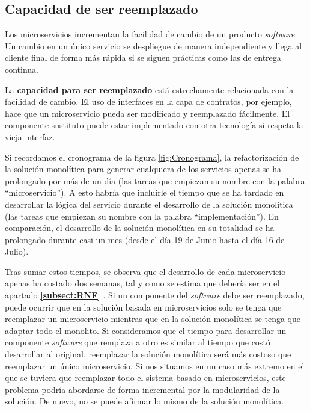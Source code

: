 \documentclass[11pt,spanish,listoffigures]{tfgetsinf}
\begin{document}
\subsection{Capacidad de ser reemplazado}

Los microservicios incrementan la facilidad de cambio de un producto \textit{software}. Un cambio en un único servicio se despliegue de manera independiente y llega al cliente final de forma más rápida si se siguen prácticas como las de entrega continua.

La \textbf{capacidad para ser reemplazado} está estrechamente relacionada con la facilidad de cambio. El uso de interfaces en la capa de contratos, por ejemplo, hace que un microservicio pueda ser modificado y reemplazado fácilmente. El componente sustituto puede estar implementado con otra tecnología si respeta la vieja interfaz.

Si recordamos el cronograma de la figura \ref{fig:Cronograma}, la refactorización de la solución monolítica para generar cualquiera de los servicios apenas se ha prolongado por más de un día (las tareas que empiezan su nombre con la palabra ``microservicio''). A esto habría que incluirle el tiempo que se ha tardado en desarrollar la lógica del servicio durante el desarrollo de la solución monolítica (las tareas que empiezan su nombre con la palabra ``implementación''). En comparación, el desarrollo de la solución monolítica en su totalidad se ha prolongado durante casi un mes (desde el día 19 de Junio hasta el día 16 de Julio).

Tras sumar estos tiempos, se observa que el desarrollo de cada microservicio apenas ha costado dos semanas, tal y como se estima que debería ser en el apartado \textbf{\ref{subsect:RNF} }. Si un componente del \textit{software} debe ser reemplazado, puede ocurrir que en la solución basada en microservicios solo se tenga que reemplazar un microservicio mientras que en la solución monolítica se tenga que adaptar todo el monolito. Si consideramos que el tiempo para desarrollar un componente \textit{software} que remplaza a otro es similar al tiempo que costó desarrollar al original, reemplazar la solución monolítica será más costoso que reemplazar un único microservicio. Si nos situamos en un caso más extremo en el que se tuviera que reemplazar todo el sistema basado en microservicios, este problema podría abordarse de forma incremental por la modularidad de la solución. De nuevo, no se puede afirmar lo mismo de la solución monolítica.
\end{document}
